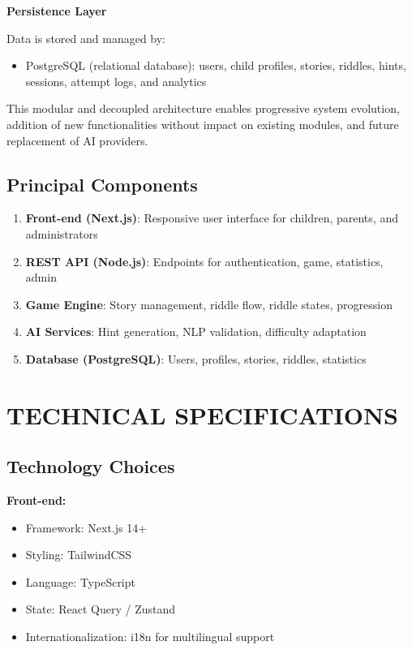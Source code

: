 \documentclass[12pt,a4paper]{article}
\begin{document}
\textbf{Persistence Layer}

Data is stored and managed by:
\begin{itemize}
    \item PostgreSQL (relational database): users, child profiles, stories, riddles, hints, sessions, attempt logs, and analytics
\end{itemize}

This modular and decoupled architecture enables progressive system evolution, addition of new functionalities without impact on existing modules, and future replacement of AI providers.

\subsection{Principal Components}

\begin{enumerate}
    \item \textbf{Front-end (Next.js)}: Responsive user interface for children, parents, and administrators
    \item \textbf{REST API (Node.js)}: Endpoints for authentication, game, statistics, admin
    \item \textbf{Game Engine}: Story management, riddle flow, riddle states, progression
    \item \textbf{AI Services}: Hint generation, NLP validation, difficulty adaptation
    \item \textbf{Database (PostgreSQL)}: Users, profiles, stories, riddles, statistics
\end{enumerate}


\newpage

\section{TECHNICAL SPECIFICATIONS}

\subsection{Technology Choices}

\textbf{Front-end:}
\begin{itemize}
    \item Framework: Next.js 14+
    \item Styling: TailwindCSS
    \item Language: TypeScript
    \item State: React Query / Zustand
    \item Internationalization: i18n for multilingual support
\end{itemize}
\end{document}
